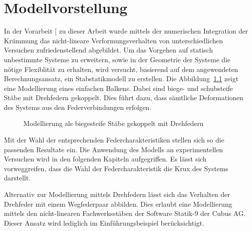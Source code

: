 \documentclass[
  11pt,
  letterpaper,
]{scrreprt}
\begin{document}

\chapter{Modellvorstellung}\label{sec-modellvorstellung}

In der Vorarbeit {[}\citeproc{ref-gitz_ansatze_2024}{1}{]} zu dieser
Arbeit wurde mittels der numerischen Integration der Krümmung das
nicht-lineare Verformungsverhalten von unterschiedlichen Versuchen
zufriedenstellend abgebildet. Um das Vorgehen auf statisch unbestimmte
Systeme zu erweitern, sowie in der Geometrie der Systeme die nötige
Flexiblität zu erhalten, wird versucht, basierend auf dem angewendeten
Berechnungsansatz, ein Stabstatikmodell zu erstellen. Die
Abbildung~\ref{fig-modell_drehfeder} zeigt eine Modellierung eines
einfachen Balkens. Dabei sind biege- und schubsteife Stäbe mit
Drehfedern gekoppelt. Dies führt dazu, dass sämtliche Deformationen des
Systems aus den Federverbindungen erfolgen.

\begin{figure}[H]


\caption{\label{fig-modell_drehfeder}Modellierung als biegesteife Stäbe
gekoppelt mit Drehfedern}

\end{figure}%

Mit der Wahl der entsprechenden Federcharakteristiken stellen sich so
die passenden Resultate ein. Die Anwendung des Modells an
experimentellen Versuchen wird in den folgenden Kapiteln aufgegriffen.
Es lässt sich vorweggreifen, dass die Wahl der Federcharakteristik die
Krux des Systems darstellt.

Alternativ zur Modellierung mittels Drehfedern lässt sich das Verhalten
der Drehfeder mit einem Wegfederpaar abbilden. Dies erlaubt eine
Modellierung mittels den nicht-linearen Fachwerksstäben der Software
Statik-9 der Cubus AG. Dieser Ansatz wird lediglich im
Einführungsbeispiel berücksichtigt.
\end{document}
